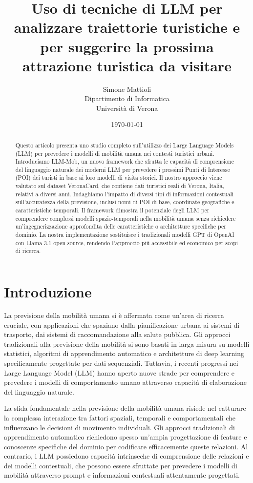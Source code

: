 \documentclass[12pt,a4paper]{article}
\title{Uso di tecniche di LLM per analizzare traiettorie turistiche e per suggerire la prossima attrazione turistica da visitare}
\author{
Simone Mattioli\\
Dipartimento di Informatica\\
Università di Verona\\
}
\date{\today}
\begin{document}
\maketitle

\begin{abstract}
Questo articolo presenta uno studio completo sull'utilizzo dei Large Language Models (LLM) per prevedere i modelli di mobilità umana nei contesti turistici urbani. Introduciamo LLM-Mob, un nuovo framework che sfrutta le capacità di comprensione del linguaggio naturale dei moderni LLM per prevedere i prossimi Punti di Interesse (POI) dei turisti in base ai loro modelli di visita storici. Il nostro approccio viene valutato sul dataset VeronaCard, che contiene dati turistici reali di Verona, Italia, relativi a diversi anni. Indaghiamo l'impatto di diversi tipi di informazioni contestuali sull'accuratezza della previsione, inclusi nomi di POI di base, coordinate geografiche e caratteristiche temporali. Il framework dimostra il potenziale degli LLM per comprendere complessi modelli spazio-temporali nella mobilità umana senza richiedere un'ingegnerizzazione approfondita delle caratteristiche o architetture specifiche per dominio. La nostra implementazione sostituisce i tradizionali modelli GPT di OpenAI con Llama 3.1 open source, rendendo l'approccio più accessibile ed economico per scopi di ricerca.
\end{abstract}

\newpage

\section{Introduzione}

La previsione della mobilità umana si è affermata come un'area di ricerca cruciale, con applicazioni che spaziano dalla pianificazione urbana ai sistemi di trasporto, dai sistemi di raccomandazione alla salute pubblica. Gli approcci tradizionali alla previsione della mobilità si sono basati in larga misura su modelli statistici, algoritmi di apprendimento automatico e architetture di deep learning specificamente progettate per dati sequenziali. Tuttavia, i recenti progressi nei Large Language Model (LLM) hanno aperto nuove strade per comprendere e prevedere i modelli di comportamento umano attraverso capacità di elaborazione del linguaggio naturale.

La sfida fondamentale nella previsione della mobilità umana risiede nel catturare la complessa interazione tra fattori spaziali, temporali e comportamentali che influenzano le decisioni di movimento individuali. Gli approcci tradizionali di apprendimento automatico richiedono spesso un'ampia progettazione di feature e conoscenze specifiche del dominio per codificare efficacemente queste relazioni. Al contrario, i LLM possiedono capacità intrinseche di comprensione delle relazioni e dei modelli contestuali, che possono essere sfruttate per prevedere i modelli di mobilità attraverso prompt e informazioni contestuali attentamente progettati.
\end{document}
